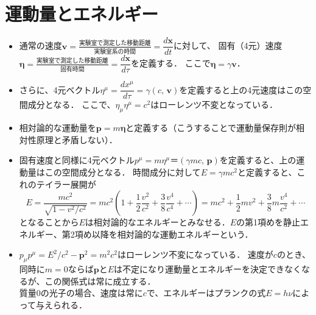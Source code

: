 \documentclass[11pt,a4j]{jarticle}
\begin{document}
\section{運動量とエネルギー}
\begin{itemize}
	\item 通常の速度$\bm{v} = \frac{\mbox{実験室で測定した移動距離}}{\mbox{実験室系の時間}} = \dfrac{d\bm{x}}{dt}$に対して、
	固有（4元）速度$\bm{\eta} = \frac{\mbox{実験室で測定した移動距離}}{\mbox{固有時間}} = \dfrac{d\bm{x}}{d\tau}$を定義する．
	ここで$\bm{\eta} = \gamma \bm{v}$．
	\item さらに、4元ベクトル$\eta^{\mu} = \dfrac{dx^{\mu}}{d\tau} = \gamma(c, \,\bm{v})$を定義すると上の4元速度はこの空間成分となる．
	ここで、$\eta_{\mu}\eta^{\mu} = c^2$はローレンツ不変となっている．
	\item 相対論的な運動量を$\bm{p}=m\bm{\eta}$と定義する（こうすることで運動量保存則が相対性原理と矛盾しない）．
	\item 固有速度と同様に4元ベクトル$p^{\mu} = m\eta^{\mu} ＝ (\gamma mc, \, \bm{p})$を定義すると、上の運動量はこの空間成分となる．
	時間成分に対して$E = \gamma mc^2$と定義すると、これのテイラー展開が
	\[
		E = \frac{mc^2}{\sqrt{1-v^2 / c^2}} = mc^2(1+\frac{1}{2}\frac{v^2}{c^2}+\frac{3}{8}\frac{v^4}{c^4}+\cdots)
		  = mc^2 + \frac{1}{2}mv^2 + \frac{3}{8}m\frac{v^4}{c^2} + \cdots
	\]
	となることから$E$は相対論的なエネルギーとみなせる．$E$の第1項めを静止エネルギー、第2項め以降を相対論的な運動エネルギーという．
	\item $p_{\mu}p^{\mu} = E^2 / c^2 - {\bm{p}}^2 = m^2c^2$はローレンツ不変になっている．
	速度が$c$のとき、同時に$m=0$ならば$\bm{p}$と$E$は不定になり運動量とエネルギーを決定できなくなるが、この関係式は常に成立する． \\
	質量0の光子の場合、速度は常に$c$で、エネルギーはプランクの式$E = h\nu$によって与えられる．
\end{itemize}
\end{document}
